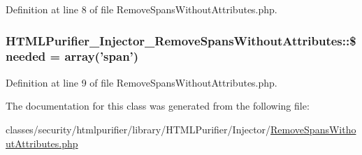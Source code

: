 Definition at line 8 of file Remove\+Spans\+Without\+Attributes.\+php.

\hypertarget{classHTMLPurifier__Injector__RemoveSpansWithoutAttributes_a139f7d7dc8163b21f02cd1838a1ef462}{
\subsubsection[{\$needed}]{\setlength{\rightskip}{0pt plus 5cm}H\+T\+M\+L\+Purifier\+\_\+\+Injector\+\_\+\+Remove\+Spans\+Without\+Attributes\+::\$needed = array('span')}}\label{classHTMLPurifier__Injector__RemoveSpansWithoutAttributes_a139f7d7dc8163b21f02cd1838a1ef462}


Definition at line 9 of file Remove\+Spans\+Without\+Attributes.\+php.



The documentation for this class was generated from the following file\+:\begin{DoxyCompactItemize}
\item 
classes/security/htmlpurifier/library/\+H\+T\+M\+L\+Purifier/\+Injector/\hyperlink{RemoveSpansWithoutAttributes_8php}{Remove\+Spans\+Without\+Attributes.\+php}\end{DoxyCompactItemize}
